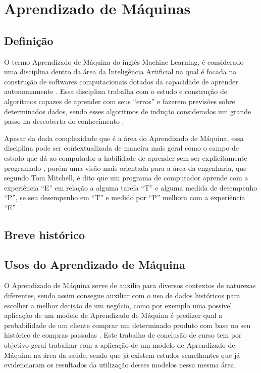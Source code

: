 \chapter{Aprendizado de Máquinas}
\section{Definição}
O termo Aprendizado de Máquina do inglês Machine Learning, é considerado uma disciplina dentro da área da Inteligência Artificial na qual é focada na construção de softwares computacionais dotados da capacidade de aprender autonomamente \cite{Hosch}. Essa disciplina trabalha com o estudo e construção de algoritmos capazes de aprender com seus “erros” e fazerem previsões sobre determinados dados, sendo esses algoritmos de indução considerados um grande passo na descoberta do conhecimento \cite{Kohavi}.

Apesar da dada complexidade que é a área do Aprendizado de Máquina, essa disciplina pode ser contextualizada de maneira mais geral como o campo de estudo que dá ao computador a habilidade de aprender sem ser explicitamente programado \cite{Arthur}, porém uma visão mais orientada para a área da engenharia, que segundo Tom Mitchell, é dito que um programa de computador aprende com a experiência “E” em relação a alguma tarefa “T” e alguma medida de desempenho “P”, se seu desempenho em “T” e medido por “P” melhora com a experiência “E” \cite{Tom}.

\section{Breve histórico}
\section{Usos do Aprendizado de Máquina}
O Aprendizado de Máquina serve de auxílio para diversos contextos de naturezas diferentes, sendo assim consegue auxiliar com o uso de dados históricos para escolher a melhor decisão de um negócio, como por exemplo uma possível aplicação de um modelo de Aprendizado de Máquina é predizer qual a probabilidade de um cliente comprar um determinado produto com base no seu histórico de compras passadas \cite{Amazon}. Este trabalho de conclusão de curso tem por objetivo geral trabalhar com a aplicação de um modelo de Aprendizado de Máquina na área da saúde, sendo que já existem estudos semelhantes que já evidenciaram os resultados da utilização desses modelos nessa mesma área.

